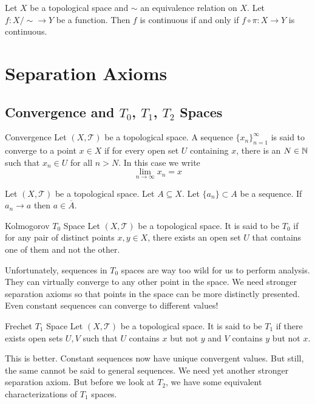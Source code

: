 \documentclass[a4paper]{article}
\begin{document}
\begin{prp}{}{} Let $X$ be a topological space and $\sim$ an equivalence relation on $X$. Let $f:X/\sim\to Y$ be a function. Then $f$ is continuous if and only if $f\circ\pi:X\to Y$ is continuous. 
\end{prp}

\pagebreak
\section{Separation Axioms}
\subsection{Convergence and $T_0$, $T_1$, $T_2$ Spaces}
\begin{defn}{Convergence}{} Let $(X,\mathcal{T})$ be a topological space. A sequence $\{x_n\}_{n=1}^\infty$ is said to converge to a point $x\in X$ if for every open set $U$ containing $x$, there is an $N\in\mathbb{N}$ such that $x_n\in U$ for all $n>N$. In this case we write $$\lim_{n\to\infty}x_n=x$$
\end{defn}

\begin{prp}{}{} Let $(X,\mathcal{T})$ be a topological space. Let $A\subseteq X$. Let $\{a_n\}\subset A$ be a sequence. If $a_n\to a$ then $a\in\overline{A}$. 
\end{prp}

\begin{defn}{Kolmogorov $T_0$ Space}{} Let $(X,\mathcal{T})$ be a topological space. It is said to be $T_0$ if for any pair of distinct points $x,y\in X$, there exists an open set $U$ that contains one of them and not the other. 
\end{defn}

Unfortunately, sequences in $T_0$ spaces are way too wild for us to perform analysis. They can virtually converge to any other point in the space. We need stronger separation axioms so that points in the space can be more distinctly presented. Even constant sequences can converge to different values!

\begin{defn}{Frechet $T_1$ Space}{} Let $(X,\mathcal{T})$ be a topological space. It is said to be $T_1$ if there exists open sets $U,V$ such that $U$ contains $x$ but not $y$ and $V$ contains $y$ but not $x$. 
\end{defn}

This is better. Constant sequences now have unique convergent values. But still, the same cannot be said to general sequences. We need yet another stronger separation axiom. But before we look at $T_2$, we have some equivalent characterizations of $T_1$ spaces. 
\end{document}
